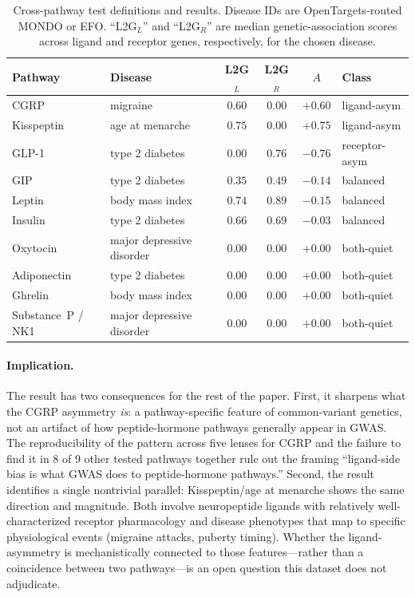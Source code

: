 \documentclass[11pt]{article}
\begin{document}
\begin{table}[h]
\centering
\caption{Cross-pathway test definitions and results. Disease IDs are OpenTargets-routed MONDO or EFO. ``L2G$_L$'' and ``L2G$_R$'' are median genetic-association scores across ligand and receptor genes, respectively, for the chosen disease.}
\label{tab:gen}
\small
\begin{tabular}{l l c c c l}
\toprule
Pathway & Disease & L2G$_L$ & L2G$_R$ & $A$ & Class \\
\midrule
CGRP            & migraine                 & $0.60$ & $0.00$ & $+0.60$ & ligand-asym \\
Kisspeptin      & age at menarche          & $0.75$ & $0.00$ & $+0.75$ & ligand-asym \\
GLP-1           & type 2 diabetes          & $0.00$ & $0.76$ & $-0.76$ & receptor-asym \\
GIP             & type 2 diabetes          & $0.35$ & $0.49$ & $-0.14$ & balanced \\
Leptin          & body mass index          & $0.74$ & $0.89$ & $-0.15$ & balanced \\
Insulin         & type 2 diabetes          & $0.66$ & $0.69$ & $-0.03$ & balanced \\
Oxytocin        & major depressive disorder & $0.00$ & $0.00$ & $+0.00$ & both-quiet \\
Adiponectin     & type 2 diabetes          & $0.00$ & $0.00$ & $+0.00$ & both-quiet \\
Ghrelin         & body mass index          & $0.00$ & $0.00$ & $+0.00$ & both-quiet \\
Substance~P / NK1 & major depressive disorder & $0.00$ & $0.00$ & $+0.00$ & both-quiet \\
\bottomrule
\end{tabular}
\end{table}

\paragraph{Implication.} The result has two consequences for the rest of the paper. First, it sharpens what the CGRP asymmetry \emph{is}: a pathway-specific feature of common-variant genetics, not an artifact of how peptide-hormone pathways generally appear in GWAS. The reproducibility of the pattern across five lenses for CGRP and the failure to find it in 8 of 9 other tested pathways together rule out the framing ``ligand-side bias is what GWAS does to peptide-hormone pathways.'' Second, the result identifies a single nontrivial parallel: Kisspeptin/age at menarche shows the same direction and magnitude. Both involve neuropeptide ligands with relatively well-characterized receptor pharmacology and disease phenotypes that map to specific physiological events (migraine attacks, puberty timing). Whether the ligand-asymmetry is mechanistically connected to those features---rather than a coincidence between two pathways---is an open question this dataset does not adjudicate.
\end{document}
